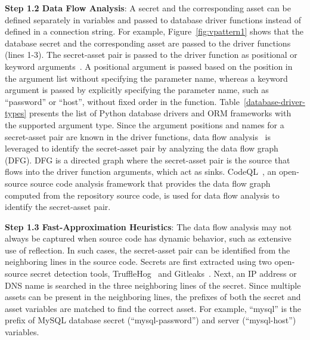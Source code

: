 \textbf{Step 1.2 Data Flow Analysis}: A secret and the corresponding asset can be defined separately in variables and passed to database driver functions instead of defined in a connection string. For example, Figure~\ref{fig:vpattern1} shows that the database secret and the corresponding asset are passed to the driver functions (lines 1-3). The secret-asset pair is passed to the driver function as positional or keyword arguments~\cite{positionalarg}. A positional argument is passed based on the position in the argument list without specifying the parameter name, whereas a keyword argument is passed by explicitly specifying the parameter name, such as ``password'' or ``host'', without fixed order in the function. Table~\ref{database-driver-types} presents the list of Python database drivers and ORM frameworks with the supported argument type. Since the argument positions and names for a secret-asset pair are known in the driver functions, data flow analysis~\cite{khedker2017data} is leveraged to identify the secret-asset pair by analyzing the data flow graph (DFG). DFG is a directed graph where the secret-asset pair is the source that flows into the driver function arguments, which act as sinks. CodeQL~\cite{codeql}, an open-source source code analysis framework that provides the data flow graph computed from the repository source code, is used for data flow analysis to identify the secret-asset pair.




\textbf{Step 1.3 Fast-Approximation Heuristics}: The data flow analysis may not always be captured when source code has dynamic behavior, such as extensive use of reflection. In such cases, the secret-asset pair can be identified from the neighboring lines in the source code. Secrets are first extracted using two open-source secret detection tools, TruffleHog~\cite{trufflehog} and Gitleaks~\cite{gitleaks}. Next, an IP address or DNS name is searched in the three neighboring lines of the secret. Since multiple assets can be present in the neighboring lines, the prefixes of both the secret and asset variables are matched to find the correct asset. For example, ``mysql'' is the prefix of MySQL database secret (``mysql-password'') and server (``mysql-host'') variables.




